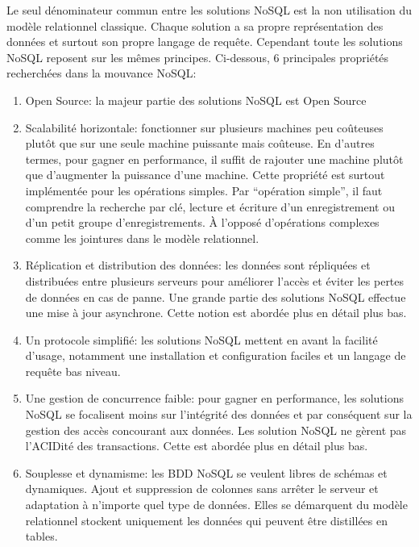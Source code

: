 Le seul dénominateur commun entre les solutions \textsf{NoSQL} est la
non utilisation du modèle relationnel
classique\cite{NealLeavitt}. Chaque solution a sa propre
représentation des données et surtout son propre langage de
requête\cite{SergeLeblal}. Cependant toute les
solutions \textsf{NoSQL} reposent sur les mêmes principes. Ci-dessous,
6 principales propriétés recherchées dans la
mouvance \textsf{NoSQL}:

\begin{enumerate}

\item \textsf{Open Source}: la majeur partie des solutions \textsf{NoSQL} est \textsf{Open Source}

\item \textsf{Scalabilité horizontale}: fonctionner sur plusieurs machines peu coûteuses plutôt que sur une seule machine puissante mais coûteuse\cite{NealLeavitt}. En d'autres termes, pour gagner en performance, il suffit de rajouter une machine plutôt que d'augmenter la puissance d'une machine. Cette propriété est surtout implémentée pour les 
      opérations simples. Par ``opération simple'', il faut comprendre
      la recherche par clé, lecture et écriture d'un enregistrement ou
      d'un petit groupe d'enregistrements. À l'opposé d'opérations
      complexes comme les jointures dans le modèle
      relationnel\cite{RickCattell}.

\item \textsf{Réplication et distribution des données}: les données sont répliquées et distribuées entre plusieurs serveurs pour améliorer l'accès et éviter les pertes de données en cas de panne. Une grande partie des solutions \textsf{NoSQL} effectue une mise à jour asynchrone. Cette notion est abordée plus en détail plus bas.

\item \textsf{Un protocole simplifié}: les solutions \textsf{NoSQL} mettent en avant la facilité d'usage, notamment une installation et configuration faciles et un langage de requête bas niveau.

\item \textsf{Une gestion de concurrence faible}: pour gagner en performance, les solutions \textsf{NoSQL} se focalisent moins sur l'intégrité des données et par conséquent sur la gestion des accès concourant aux données. Les solution \textsf{NoSQL} ne gèrent pas l'\textsf{ACIDité} des transactions. Cette est abordée plus en détail plus bas.

\item \textsf{Souplesse et dynamisme}: les \textsf{BDD NoSQL} se veulent libres de schémas et dynamiques. Ajout et suppression de colonnes sans arrêter le serveur et adaptation à n'importe quel type de données. Elles se démarquent du modèle relationnel stockent uniquement les données qui peuvent être distillées en tables.
\end{enumerate}
